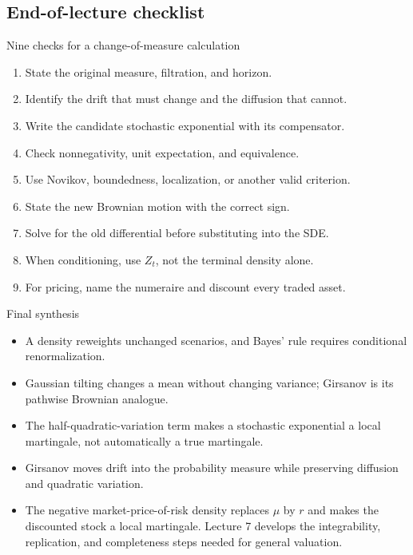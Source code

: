\documentclass[10pt]{article}
\newcommand{\1}{\mathbf 1}
\theoremstyle{definition}
\begin{document}
\clearpage
\subsection{End-of-lecture checklist}

\begin{keyidea}{Nine checks for a change-of-measure calculation}
\begin{enumerate}
  \item State the original measure, filtration, and horizon.
  \item Identify the drift that must change and the diffusion that cannot.
  \item Write the candidate stochastic exponential with its compensator.
  \item Check nonnegativity, unit expectation, and equivalence.
  \item Use Novikov, boundedness, localization, or another valid criterion.
  \item State the new Brownian motion with the correct sign.
  \item Solve for the old differential before substituting into the SDE.
  \item When conditioning, use \(Z_t\), not the terminal density alone.
  \item For pricing, name the numeraire and discount every traded asset.
\end{enumerate}
\end{keyidea}

\begin{keyidea}{Final synthesis}
\begin{itemize}
  \item A density reweights unchanged scenarios, and Bayes' rule requires
        conditional renormalization.
  \item Gaussian tilting changes a mean without changing variance; Girsanov
        is its pathwise Brownian analogue.
  \item The half-quadratic-variation term makes a stochastic exponential a
        local martingale, not automatically a true martingale.
  \item Girsanov moves drift into the probability measure while preserving
        diffusion and quadratic variation.
  \item The negative market-price-of-risk density replaces \(\mu\) by \(r\)
        and makes the discounted stock a local martingale. Lecture 7
        develops the integrability, replication, and completeness steps
        needed for general valuation.
\end{itemize}
\end{keyidea}
\end{document}
